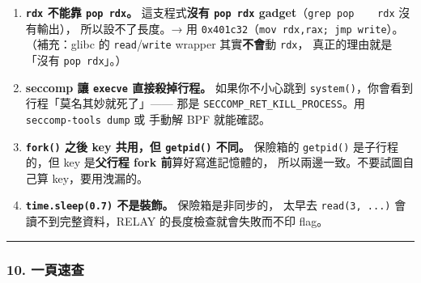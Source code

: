 \documentclass[10pt,a4paper]{article}
\begin{document}
\begin{enumerate}
{  qword}（階段 1 的「\texttt{read} 目標」是 \texttt{SUBMIT} 當時的
  \texttt{rsp}；階段 2 之後是 \texttt{A1} / \texttt{A2} /
  \texttt{A3}）。 忘記補這個 offset 是最常見的錯。
\item
  \textbf{\texttt{rdx} 不能靠 \texttt{pop\ \allowbreak{}rdx}。} 這支程式\textbf{沒有
  \texttt{pop\ \allowbreak{}rdx}
  gadget}（\texttt{grep\ \allowbreak{}\textquotesingle{}\allowbreak{}pop\ \allowbreak{}\ \allowbreak{}\ \allowbreak{}\ \allowbreak{}rdx\textquotesingle{}\allowbreak{}}
  沒有輸出）， 所以設不了長度。→ 用
  \texttt{0x401c32}（\texttt{mov\ \allowbreak{}rdx,\allowbreak{}rax;\ \allowbreak{}jmp\ \allowbreak{}write}）。
  （補充：glibc 的 \texttt{read}/\texttt{write} wrapper
  其實\textbf{不會}動 \texttt{rdx}， 真正的理由就是「沒有
  \texttt{pop\ \allowbreak{}rdx}」。）
\item
  \textbf{seccomp 讓 \texttt{execve} 直接殺掉行程。} 如果你不小心跳到
  \texttt{system()}，你會看到行程「莫名其妙就死了」------ 那是
  \texttt{SECCOMP\_\allowbreak{}RET\_\allowbreak{}KILL\_\allowbreak{}PROCESS}。用 \texttt{seccomp-\allowbreak{}tools\ \allowbreak{}dump}
  或 手動解 BPF 就能確認。
\item
  \textbf{\texttt{fork()} 之後 key 共用，但 \texttt{getpid()} 不同。}
  保險箱的 \texttt{getpid()} 是子行程的，但 key 是\textbf{父行程 fork
  前}算好寫進記憶體的， 所以兩邊一致。不要試圖自己算 key，要用洩漏的。
\item
  \textbf{\texttt{time.\allowbreak{}sleep(0.\allowbreak{}7)} 不是裝飾。} 保險箱是非同步的， 太早去
  \texttt{read(3,\allowbreak{}\ \allowbreak{}...)} 會讀不到完整資料，RELAY
  的長度檢查就會失敗而不印 flag。
\end{enumerate}

\begin{center}\rule{0.5\linewidth}{0.5pt}\end{center}

\subsubsection{10. 一頁速查}\label{ux4e00ux9801ux901fux67e5-1}
\end{document}
